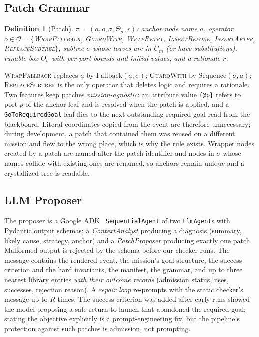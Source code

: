 \documentclass[conference]{IEEEtran}
\newtheorem{definition}{Definition}
\begin{document}
\subsection{Patch Grammar}
\label{sec:patches}
\begin{definition}[Patch]
$\pi=(a, o, \sigma, \Theta_\sigma, r)$: anchor node name $a$, operator $o\in\mathcal{O}=\{$\textsc{WrapFallback}, \textsc{GuardWith}, \textsc{WrapRetry}, \textsc{InsertBefore}, \textsc{InsertAfter}, \textsc{ReplaceSubtree}$\}$, subtree $\sigma$ whose leaves are in $C_m$ (or have substitutions), tunable box $\Theta_\sigma$ with per-port bounds and initial values, and a rationale $r$.
\end{definition}
\textsc{WrapFallback} replaces $a$ by $\mathrm{Fallback}(a,\sigma)$; \textsc{GuardWith} by $\mathrm{Sequence}(\sigma,a)$; \textsc{ReplaceSubtree} is the only operator that deletes logic and requires a rationale. Two features keep patches \emph{mission-agnostic}: an attribute value \texttt{\{@p\}} refers to port $p$ of the anchor leaf and is resolved when the patch is applied, and a \texttt{GoToRequiredGoal} leaf flies to the next outstanding required goal read from the blackboard. Literal coordinates copied from the event are therefore unnecessary; during development, a patch that contained them was reused on a different mission and flew to the wrong place, which is why the rule exists. Wrapper nodes created by a patch are named after the patch identifier and nodes in $\sigma$ whose names collide with existing ones are renamed, so anchors remain unique and a crystallized tree is readable.

\subsection{LLM Proposer}
The proposer is a Google ADK~\cite{adk} \texttt{SequentialAgent} of two \texttt{LlmAgent}s with Pydantic output schemas: a \emph{ContextAnalyst} producing a diagnosis (summary, likely cause, strategy, anchor) and a \emph{PatchProposer} producing exactly one patch. Malformed output is rejected by the schema before our checker runs. The message contains the rendered event, the mission's goal structure, the success criterion and the hard invariants, the manifest, the grammar, and up to three nearest library entries \emph{with their outcome records} (admission status, uses, successes, rejection reason). A \emph{repair loop} re-prompts with the static checker's message up to $R$ times. The success criterion was added after early runs showed the model proposing a safe return-to-launch that abandoned the required goal; stating the objective explicitly is a prompt-engineering fix, but the pipeline's protection against such patches is admission, not prompting.
\end{document}
